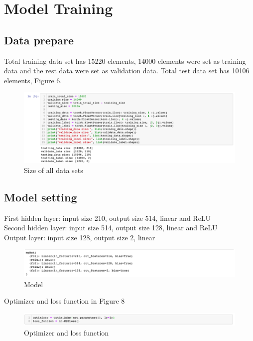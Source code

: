 \documentclass{article}
\begin{document}
\section{Model Training}

\subsection{Data prepare}

Total training data set has 15220 elements, 14000 elements were set as training data and the rest data were set as validation data. Total test data set has 10106 elements, Figure 6.

\begin{figure}[h]
  \centering
  \includegraphics[width=1.0\textwidth]{img/Picture 5}
  \caption{Size of all data sets}
\end{figure}

\subsection{Model setting}

First hidden layer: input size 210, output size 514, linear and ReLU\\
Second hidden layer: input size 514, output size 128, linear and ReLU\\
Output layer: input size 128, output size 2, linear

\begin{figure}[h]
  \centering
  \includegraphics[width=1.0\textwidth]{img/Picture 6}
  \caption{Model}
\end{figure}

Optimizer and loss function in Figure 8

\begin{figure}[h]
  \centering
  \includegraphics[width=1.0\textwidth]{img/Picture 7}
  \caption{Optimizer and loss function }
\end{figure}
\end{document}
